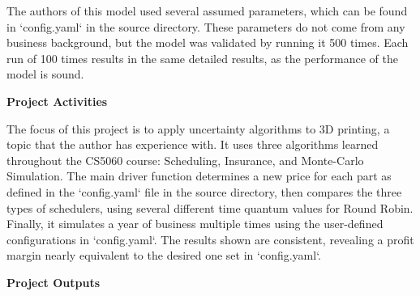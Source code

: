 \documentclass[11pt]{article}
\begin{document}

The authors of this model used several assumed parameters, which can be found in `config.yaml` in the source directory. These parameters do not come
from any business background, but the model was validated by running it 500 times. Each run of 100 times results in the same detailed results, as the
performance of the model is sound.

\begin{center}
    \LARGE
    \textbf{Project Activities}
\end{center}

%

The focus of this project is to apply uncertainty algorithms to 3D printing, a topic that the author has experience with. It uses three algorithms learned throughout
the CS5060 course: Scheduling, Insurance, and Monte-Carlo Simulation. The main driver function determines a new price for each part as defined in the `config.yaml`
file in the source directory, then compares the three types of schedulers, using several different time quantum values for Round Robin. Finally, it simulates a year
of business multiple times using the user-defined configurations in `config.yaml`. The results shown are consistent, revealing a profit margin nearly equivalent to
the desired one set in `config.yaml`.

\begin{center}
    \LARGE
    \textbf{Project Outputs}
\end{center}
\end{document}
